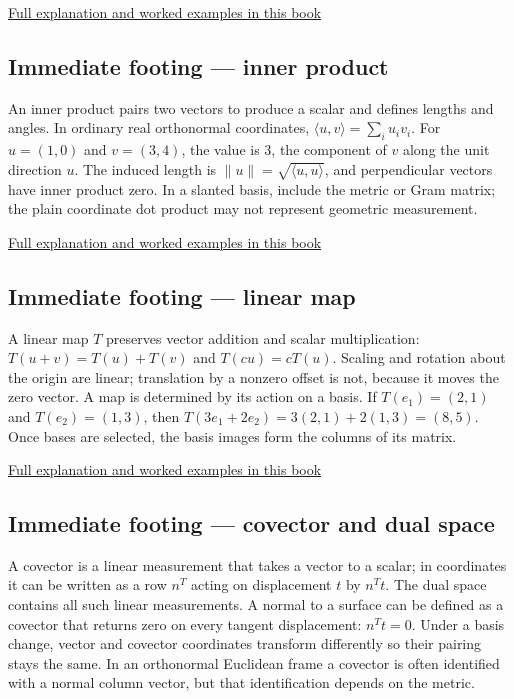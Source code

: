 \hyperref[01-foundations-i-ch018-determinant-measures-oriented-volume-and-exposes-lost-dimensions]{Full explanation and worked examples in this book}

\subsection{Immediate footing --- inner product}\label{01-foundations-i-ch018-immediate-footing-inner-product}

An inner product pairs two vectors to produce a scalar and defines lengths and angles. In ordinary real orthonormal coordinates, \(\langle u,v\rangle=\sum_i u_i v_i\). For \(u=(1,0)\) and \(v=(3,4)\), the value is \(3\), the component of \(v\) along the unit direction \(u\). The induced length is \(\|u\|=\sqrt{\langle u,u\rangle}\), and perpendicular vectors have inner product zero. In a slanted basis, include the metric or Gram matrix; the plain coordinate dot product may not represent geometric measurement.

\hyperref[01-foundations-i-ch017-the-dot-product-turns-two-movements-into-a-measurement]{Full explanation and worked examples in this book}

\subsection{Immediate footing --- linear map}\label{01-foundations-i-ch018-immediate-footing-linear-map}

A linear map \(T\) preserves vector addition and scalar multiplication: \(T(u+v)=T(u)+T(v)\) and \(T(cu)=cT(u)\). Scaling and rotation about the origin are linear; translation by a nonzero offset is not, because it moves the zero vector. A map is determined by its action on a basis. If \(T(e_1)=(2,1)\) and \(T(e_2)=(1,3)\), then \(T(3e_1+2e_2)=3(2,1)+2(1,3)=(8,5)\). Once bases are selected, the basis images form the columns of its matrix.

\hyperref[01-foundations-i-ch018-the-robot-needs-a-rule-for-moving-every-direction]{Full explanation and worked examples in this book}

\subsection{Immediate footing --- covector and dual space}\label{01-foundations-i-ch018-immediate-footing-covector-and-dual-space}

A covector is a linear measurement that takes a vector to a scalar; in coordinates it can be written as a row \(n^T\) acting on displacement \(t\) by \(n^Tt\). The dual space contains all such linear measurements. A normal to a surface can be defined as a covector that returns zero on every tangent displacement: \(n^Tt=0\). Under a basis change, vector and covector coordinates transform differently so their pairing stays the same. In an orthonormal Euclidean frame a covector is often identified with a normal column vector, but that identification depends on the metric.

